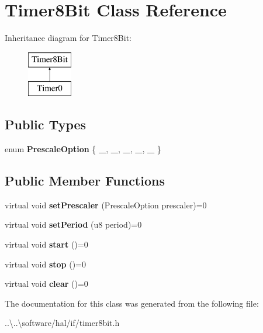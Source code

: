 \hypertarget{class_timer8_bit}{}\section{Timer8\+Bit Class Reference}
\label{class_timer8_bit}
Inheritance diagram for Timer8\+Bit\+:\begin{figure}[H]
\begin{center}
\leavevmode
\includegraphics[height=2.000000cm]{class_timer8_bit}
\end{center}
\end{figure}
\subsection*{Public Types}
\begin{DoxyCompactItemize}
\item 
\mbox{\label{class_timer8_bit_a6ce4007894d75d11e1c42272ce02e300}} 
enum {\bfseries Prescale\+Option} \{ \newline
{\bfseries \+\_}, 
{\bfseries \+\_}, 
{\bfseries \+\_}, 
{\bfseries \+\_}, 
\newline
{\bfseries \+\_}
 \}
\end{DoxyCompactItemize}
\subsection*{Public Member Functions}
\begin{DoxyCompactItemize}
\item 
\mbox{\label{class_timer8_bit_a25936cc143d3a691c6b4af8e8101fb2e}} 
virtual void {\bfseries set\+Prescaler} (Prescale\+Option prescaler)=0
\item 
\mbox{\label{class_timer8_bit_ab180e7c393b4ba33a689de92e6ca3405}} 
virtual void {\bfseries set\+Period} (u8 period)=0
\item 
\mbox{\label{class_timer8_bit_adb347e6c1160be1766cd73c6c8940515}} 
virtual void {\bfseries start} ()=0
\item 
\mbox{\label{class_timer8_bit_a85d81aff44c77f38282172a6f89986ce}} 
virtual void {\bfseries stop} ()=0
\item 
\mbox{\label{class_timer8_bit_a0889614f99eb7ee2470e822ef58ca83d}} 
virtual void {\bfseries clear} ()=0
\end{DoxyCompactItemize}


The documentation for this class was generated from the following file\+:\begin{DoxyCompactItemize}
\item 
..\textbackslash{}..\textbackslash{}software/hal/if/timer8bit.\+h\end{DoxyCompactItemize}
